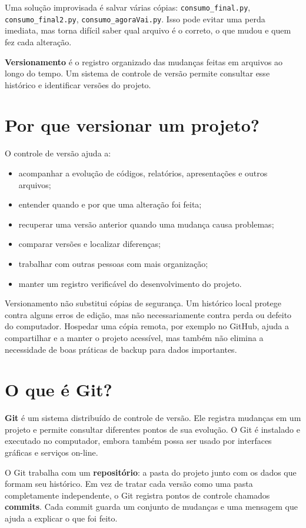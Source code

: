 \documentclass[12pt,a4paper]{article}
\begin{document}
Uma solução improvisada é salvar várias cópias: \texttt{consumo\_final.py}, \texttt{consumo\_final2.py}, \texttt{consumo\_agoraVai.py}. Isso pode evitar uma perda imediata, mas torna difícil saber qual arquivo é o correto, o que mudou e quem fez cada alteração.

\begin{conceito}
\textbf{Versionamento} é o registro organizado das mudanças feitas em arquivos ao longo do tempo. Um sistema de controle de versão permite consultar esse histórico e identificar versões do projeto.
\end{conceito}

\section{Por que versionar um projeto?}
O controle de versão ajuda a:
\begin{itemize}
\item acompanhar a evolução de códigos, relatórios, apresentações e outros arquivos;
\item entender quando e por que uma alteração foi feita;
\item recuperar uma versão anterior quando uma mudança causa problemas;
\item comparar versões e localizar diferenças;
\item trabalhar com outras pessoas com mais organização;
\item manter um registro verificável do desenvolvimento do projeto.
\end{itemize}

Versionamento não substitui cópias de segurança. Um histórico local protege contra alguns erros de edição, mas não necessariamente contra perda ou defeito do computador. Hospedar uma cópia remota, por exemplo no GitHub, ajuda a compartilhar e a manter o projeto acessível, mas também não elimina a necessidade de boas práticas de backup para dados importantes.

\section{O que é Git?}
\textbf{Git} é um sistema distribuído de controle de versão. Ele registra mudanças em um projeto e permite consultar diferentes pontos de sua evolução. O Git é instalado e executado no computador, embora também possa ser usado por interfaces gráficas e serviços on-line.

O Git trabalha com um \textbf{repositório}: a pasta do projeto junto com os dados que formam seu histórico. Em vez de tratar cada versão como uma pasta completamente independente, o Git registra pontos de controle chamados \textbf{commits}. Cada commit guarda um conjunto de mudanças e uma mensagem que ajuda a explicar o que foi feito.
\end{document}
